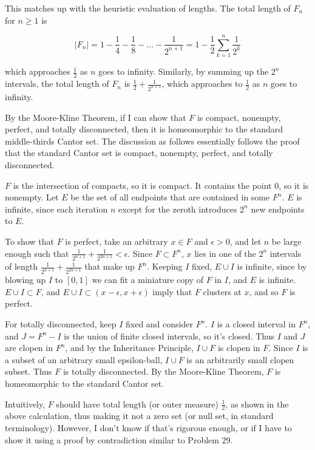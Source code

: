 \documentclass{article}
\begin{document}
This matches up with the heuristic evaluation of lengths. The total length of $F_n$ for $n \geq 1$ is

\[
|F_n| = 1 - \frac{1}{4} - \frac{1}{8} - \dots - \frac{1}{2^{n+1}} = 1 - \frac{1}{2} \sum_{k=1}^n \frac{1}{2^k}
\]

which approaches $\frac{1}{2}$ as $n$ goes to infinity. Similarly, by summing up the $2^n$ intervals, the total length of $F_n$ is $\frac{1}{2} + \frac{1}{2^{n+1}}$, which approaches to $\frac{1}{2}$ as $n$ goes to infinity.

By the Moore-Kline Theorem, if I can show that $F$ is compact, nonempty, perfect, and totally disconnected, then it is homeomorphic to the standard middle-thirds Cantor set. The discussion as follows essentially follows the proof that the standard Cantor set is compact, nonempty, perfect, and totally disconnected.

$F$ is the intersection of compacts, so it is compact. It contains the point $0$, so it is nonempty. Let $E$ be the set of all endpoints that are contained in some $F^n$. $E$ is infinite, since each iteration $n$ except for the zeroth introduces $2^n$ new endpoints to $E$.

To show that $F$ is perfect, take an arbitrary $x \in F$ and $\epsilon > 0$, and let $n$ be large enough such that $\frac{1}{2^{n+1}} + \frac{1}{2^{2n+1}} < \epsilon$. Since $F \subset F^n$, $x$ lies in one of the $2^n$ intervals of length $\frac{1}{2^{n+1}} + \frac{1}{2^{2n+1}}$ that make up $F^n$. Keeping $I$ fixed, $E \cup I$ is infinite, since by blowing up $I$ to $[0, 1]$ we can fit a miniature copy of $F$ in $I$, and $E$ is infinite. $E \cup I \subset F$, and $E \cup I \subset (x - \epsilon, x + \epsilon)$ imply that $F$ clusters at $x$, and so $F$ is perfect.

For totally disconnected, keep $I$ fixed and consider $F^n$. $I$ is a closed interval in $F^n$, and $J = F^n - I$ is the union of finite closed intervals, so it's closed. Thus $I$ and $J$ are clopen in $F^n$, and by the Inheritance Principle, $I \cup F$ is clopen in $F$. Since $I$ is a subset of an arbitrary small epsilon-ball, $I \cup F$ is an arbitrarily small clopen subset. Thus $F$ is totally disconnected. By the Moore-Kline Theorem, $F$ is homeomorphic to the standard Cantor set.

Intuitively, $F$ should have total length (or outer measure) $\frac{1}{2}$, as shown in the above calculation, thus making it not a zero set (or null set, in standard terminology). However, I don't know if that's rigorous enough, or if I have to show it using a proof by contradiction similar to Problem 29.
\end{document}
